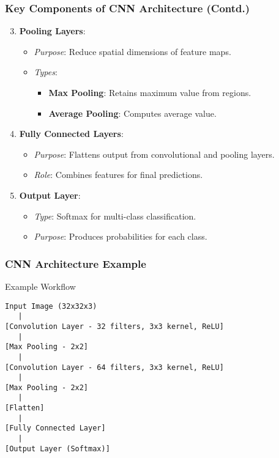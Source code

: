 \documentclass[aspectratio=169]{beamer}
\begin{document}
\begin{frame}[fragile]
    \frametitle{Key Components of CNN Architecture (Contd.)}
    \begin{enumerate}
        \setcounter{enumi}{2}
        \item \textbf{Pooling Layers}:
        \begin{itemize}
            \item \textit{Purpose}: Reduce spatial dimensions of feature maps.
            \item \textit{Types}:
            \begin{itemize}
                \item \textbf{Max Pooling}: Retains maximum value from regions.
                \item \textbf{Average Pooling}: Computes average value.
            \end{itemize}
        \end{itemize}

        \item \textbf{Fully Connected Layers}:
        \begin{itemize}
            \item \textit{Purpose}: Flattens output from convolutional and pooling layers.
            \item \textit{Role}: Combines features for final predictions.
        \end{itemize}

        \item \textbf{Output Layer}:
        \begin{itemize}
            \item \textit{Type}: Softmax for multi-class classification.
            \item \textit{Purpose}: Produces probabilities for each class.
        \end{itemize}
    \end{enumerate}
\end{frame}

\begin{frame}[fragile]
    \frametitle{CNN Architecture Example}
    \begin{block}{Example Workflow}
        \begin{verbatim}
Input Image (32x32x3) 
   |
[Convolution Layer - 32 filters, 3x3 kernel, ReLU]
   |
[Max Pooling - 2x2]
   |
[Convolution Layer - 64 filters, 3x3 kernel, ReLU]
   |
[Max Pooling - 2x2]
   |
[Flatten]
   |
[Fully Connected Layer]
   |
[Output Layer (Softmax)]
        \end{verbatim}
    \end{block}
\end{frame}
\end{document}
